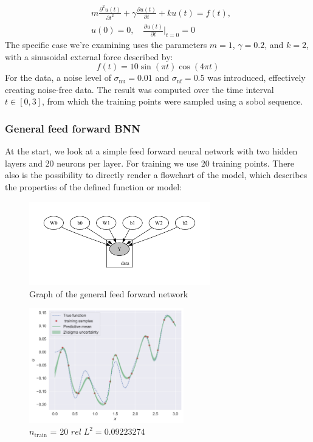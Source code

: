 \documentclass{article}
\begin{document}
\begin{align}
    & m\frac{\partial^2 u(t)}{\partial t^2} + \gamma \frac{\partial u(t)}{\partial t} + k u(t) = f(t), \\
    & u(0) = 0, \quad \frac{\partial u(t)}{\partial t}\bigg|_{t=0} = 0
\end{align}
The specific case we're examining uses the parameters \( m = 1 \), \( \gamma = 0.2 \), and \( k = 2 \), with a sinusoidal external force described by:
\begin{equation}
    f(t) = 10\sin(\pi t)\cos(4\pi t)
\end{equation}
For the data, a noise level of $\sigma_{\text{nu}} = 0.01$ and $\sigma_{\text{nf}} = 0.5$ was introduced, effectively creating noise-free data. The result was computed over the time interval \( t \in [0,3] \), from which the training points were sampled using a sobol sequence. 

\subsubsection{General feed forward BNN}
At the start, we look at a simple feed forward neural network with two hidden layers and 20 neurons per layer. For training we use 20 training points. There also is the possibility to directly render a flowchart of the model, which describes the properties of the defined function or model:
\begin{figure}[h]
    \centering
    \includegraphics[width=0.7\textwidth]{plots/bnn_oscilator1_pinn.pdf}
    \caption{Graph of the general feed forward network}
    \label{fig:training_samples}
\end{figure}

\begin{figure}[h]
    \centering
    \includegraphics[width=0.6\textwidth]{plots/BNN/oscilator1_20_[20, 20, 1].png}
    \caption{ $n_\text{train}$ = 20  $rel \; L^2 = 0.09223274$}
    \label{fig:training_samples}
\end{figure}
\end{document}
